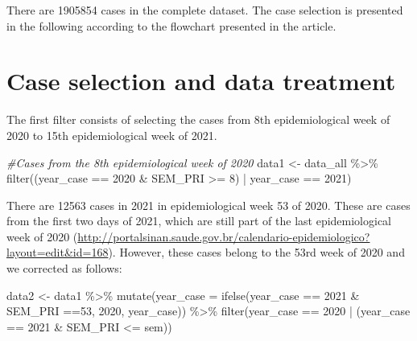 \documentclass[
]{article}
\newenvironment{Shaded}{\begin{snugshade}}{\end{snugshade}}
\newcommand{\AttributeTok}[1]{\textcolor[rgb]{0.77,0.63,0.00}{#1}}
\newcommand{\CommentTok}[1]{\textcolor[rgb]{0.56,0.35,0.01}{\textit{#1}}}
\newcommand{\DecValTok}[1]{\textcolor[rgb]{0.00,0.00,0.81}{#1}}
\newcommand{\FunctionTok}[1]{\textcolor[rgb]{0.00,0.00,0.00}{#1}}
\newcommand{\NormalTok}[1]{#1}
\newcommand{\OtherTok}[1]{\textcolor[rgb]{0.56,0.35,0.01}{#1}}
\newcommand{\SpecialCharTok}[1]{\textcolor[rgb]{0.00,0.00,0.00}{#1}}
\begin{document}
There are 1905854 cases in the complete dataset. The case selection is
presented in the following according to the flowchart presented in the
article.

\hypertarget{case-selection-and-data-treatment}{%
\section{Case selection and data
treatment}\label{case-selection-and-data-treatment}}

The first filter consists of selecting the cases from 8th
epidemiological week of 2020 to 15th epidemiological week of 2021.

\begin{Shaded}
\begin{Highlighting}[]
\CommentTok{\#Cases from the 8th epidemiological week of 2020}
\NormalTok{data1 }\OtherTok{\textless{}{-}}\NormalTok{ data\_all }\SpecialCharTok{\%\textgreater{}\%} 
  \FunctionTok{filter}\NormalTok{((year\_case }\SpecialCharTok{==} \DecValTok{2020} \SpecialCharTok{\&}\NormalTok{ SEM\_PRI }\SpecialCharTok{\textgreater{}=} \DecValTok{8}\NormalTok{) }\SpecialCharTok{|}\NormalTok{ year\_case }\SpecialCharTok{==} \DecValTok{2021}\NormalTok{)}
\end{Highlighting}
\end{Shaded}

There are 12563 cases in 2021 in epidemiological week 53 of 2020. These
are cases from the first two days of 2021, which are still part of the
last epidemiological week of 2020
(\url{http://portalsinan.saude.gov.br/calendario-epidemiologico?layout=edit\&id=168}).
However, these cases belong to the 53rd week of 2020 and we corrected as
follows:

\begin{Shaded}
\begin{Highlighting}[]
\NormalTok{data2 }\OtherTok{\textless{}{-}}\NormalTok{ data1 }\SpecialCharTok{\%\textgreater{}\%} 
  \FunctionTok{mutate}\NormalTok{(}\AttributeTok{year\_case =} \FunctionTok{ifelse}\NormalTok{(year\_case }\SpecialCharTok{==} \DecValTok{2021} \SpecialCharTok{\&}\NormalTok{ SEM\_PRI }\SpecialCharTok{==}\DecValTok{53}\NormalTok{, }\DecValTok{2020}\NormalTok{, year\_case)) }\SpecialCharTok{\%\textgreater{}\%} 
  \FunctionTok{filter}\NormalTok{(year\_case }\SpecialCharTok{==} \DecValTok{2020} \SpecialCharTok{|}\NormalTok{ (year\_case }\SpecialCharTok{==} \DecValTok{2021} \SpecialCharTok{\&}\NormalTok{ SEM\_PRI }\SpecialCharTok{\textless{}=}\NormalTok{ sem)) }
\end{Highlighting}
\end{Shaded}
\end{document}

